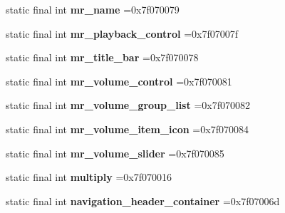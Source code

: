 \begin{DoxyCompactItemize}
\item 
\mbox{\label{classproject4_1_1xaria_1_1R_1_1id_a2b4b15c4d461e7be58080a3c23b67f97}} 
static final int {\bfseries mr\+\_\+name} =0x7f070079
\item 
\mbox{\label{classproject4_1_1xaria_1_1R_1_1id_a010f850413667df6e76e5eb0e2461ef4}} 
static final int {\bfseries mr\+\_\+playback\+\_\+control} =0x7f07007f
\item 
\mbox{\label{classproject4_1_1xaria_1_1R_1_1id_a71ddeea5298cfc3485604be4d033ceae}} 
static final int {\bfseries mr\+\_\+title\+\_\+bar} =0x7f070078
\item 
\mbox{\label{classproject4_1_1xaria_1_1R_1_1id_ac3f3fd13db93c51c04c0efb310ba844a}} 
static final int {\bfseries mr\+\_\+volume\+\_\+control} =0x7f070081
\item 
\mbox{\label{classproject4_1_1xaria_1_1R_1_1id_ad2736257b3ddfb63ea2d0baec90fa746}} 
static final int {\bfseries mr\+\_\+volume\+\_\+group\+\_\+list} =0x7f070082
\item 
\mbox{\label{classproject4_1_1xaria_1_1R_1_1id_acf9225f3fadf4083e4071d60c698159d}} 
static final int {\bfseries mr\+\_\+volume\+\_\+item\+\_\+icon} =0x7f070084
\item 
\mbox{\label{classproject4_1_1xaria_1_1R_1_1id_a7f46f64018f77e34b3b9b034141ca969}} 
static final int {\bfseries mr\+\_\+volume\+\_\+slider} =0x7f070085
\item 
\mbox{\label{classproject4_1_1xaria_1_1R_1_1id_a8dcd7c25eb76132f022a1d9dc7ff3d34}} 
static final int {\bfseries multiply} =0x7f070016
\item 
\mbox{\label{classproject4_1_1xaria_1_1R_1_1id_a6f5c85ba7d7a066505ad86b5ae0a3980}} 
static final int {\bfseries navigation\+\_\+header\+\_\+container} =0x7f07006d
\item 
\mbox{\label{classproject4_1_1xaria_1_1R_1_1id_a40c0687bce957a72a98affcb902bd9f3}} 

\end{DoxyCompactItemize}
